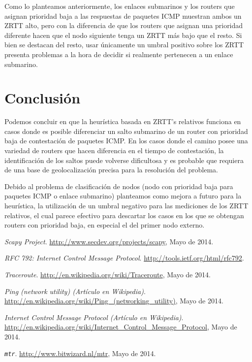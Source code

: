\documentclass[a4paper, 10pt, twoside]{article}
\begin{document}
Como lo planteamos anteriormente, los enlaces submarinos y los routers que asignan prioridad baja a las respuestas de paquetes ICMP muestran ambos un ZRTT alto, pero con la diferencia de que los routers que asignan una prioridad diferente hacen que el nodo siguiente tenga un ZRTT más bajo que el resto. Si bien se destacan del resto, usar únicamente un umbral positivo sobre los ZRTT presenta problemas a la hora de decidir si realmente pertenecen a un enlace submarino.



\section{Conclusión}

Podemos concluir en que la heurística basada en ZRTT's relativos funciona en casos donde es posible diferenciar un salto submarino de un router con prioridad baja de contestación de paquetes ICMP. En los casos donde el camino posee una variedad de routers que hacen diferencia en el tiempo de contestación, la identificación de los saltos puede volverse dificultosa y es probable que requiera de una base de geolocalización precisa para la resolución del problema.

Debido al problema de clasificación de nodos (nodo con prioridad baja para paquetes ICMP o enlace submarino) planteamos como mejora a futuro para la heurística, la utilización de un umbral negativo para las mediciones de los ZRTT relativos, el cual parece efectivo para descartar los casos en los que se obtengan routers con prioridad baja, en especial el del primer nodo externo.




\begin{thebibliography}{9}

	\emph{Scapy Project}.
	\url{http://www.secdev.org/projects/scapy}, 
	Mayo de 2014.

  \emph{RFC 792: Internet Control Message Protocol}.
  \url{http://tools.ietf.org/html/rfc792}.

  \emph{Traceroute}.
  \url{http://en.wikipedia.org/wiki/Traceroute},
  Mayo de 2014.

  \emph{Ping (network utility) (Artículo en Wikipedia)}.
  \url{http://en.wikipedia.org/wiki/Ping_(networking_utility)},
  Mayo de 2014.

  \emph{Internet Control Message Protocol (Artículo en Wikipedia)}.
  \url{http://en.wikipedia.org/wiki/Internet_Control_Message_Protocol},
  Mayo de 2014.

  \emph{\texttt{mtr}}.
  \url{http://www.bitwizard.nl/mtr}, 
  Mayo de 2014.

\end{thebibliography}
\end{document}
